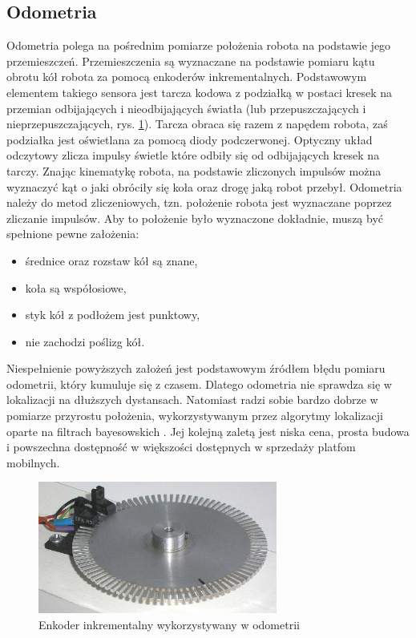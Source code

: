 \subsection{Odometria}
Odometria polega na pośrednim pomiarze położenia robota na podstawie jego przemieszczeń. Przemieszczenia są wyznaczane na podstawie pomiaru kątu obrotu kół robota za pomocą enkoderów inkrementalnych. Podstawowym elementem takiego sensora jest tarcza kodowa z podziałką w postaci kresek na przemian odbijających i nieodbijających światła (lub przepuszczających i nieprzepuszczających, rys. \ref{fig:encoder}). Tarcza obraca się razem z napędem robota, zaś podziałka jest oświetlana za pomocą diody podczerwonej. Optyczny układ odczytowy zlicza impulsy świetle które odbiły się od odbijających kresek na tarczy. Znając kinematykę robota, na podstawie zliczonych impulsów można wyznaczyć kąt o jaki obróciły się koła oraz drogę jaką robot przebył. Odometria należy do metod zliczeniowych, tzn. położenie robota jest wyznaczane poprzez zliczanie impulsów. Aby to położenie było wyznaczone dokładnie, muszą być spełnione pewne założenia:
\begin{itemize}
 \item średnice oraz rozstaw kół są znane,
 \item koła są współosiowe,
 \item styk kół z podłożem jest punktowy,
 \item nie zachodzi poślizg kół.  
\end{itemize}

Niespełnienie powyższych założeń jest podstawowym źródłem błędu pomiaru odometrii, który kumuluje się z czasem. Dlatego odometria nie sprawdza się w lokalizacji na dłuższych dystansach. Natomiast radzi sobie bardzo dobrze w pomiarze przyrostu położenia, wykorzystywanym przez algorytmy lokalizacji oparte na filtrach bayesowskich \cite{preskrypt}. Jej kolejną zaletą jest niska cena, prosta budowa i powszechna dostępność w większości dostępnych w sprzedaży platfom mobilnych.

\begin{figure}[H]
\centering
\includegraphics[width=0.7\textwidth]{img/encoder.png}
\caption{Enkoder inkrementalny wykorzystywany w odometrii}
\label{fig:encoder}
\end{figure}

